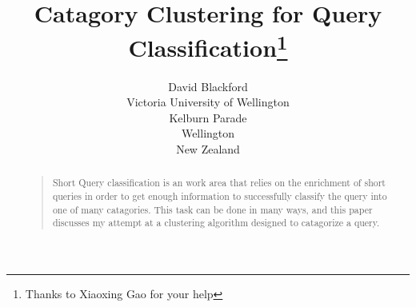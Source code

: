 \documentclass[letterpaper]{article}
\begin{document}
%
\title{Catagory Clustering for Query Classification\thanks{Thanks to Xiaoxing Gao for your help}}
\author{David Blackford\\
Victoria University of Wellington\\
Kelburn Parade\\
Wellington\\
New Zealand\\
}
\maketitle
\begin{abstract}
\begin{quote}
Short Query classification is an work area that relies on the enrichment of short queries in order to get enough information to successfully classify the query into 
one of many catagories. This task can be done in many ways, and this paper discusses my attempt at a clustering algorithm designed to catagorize a query.
\end{quote}
\end{abstract}
\end{document}
